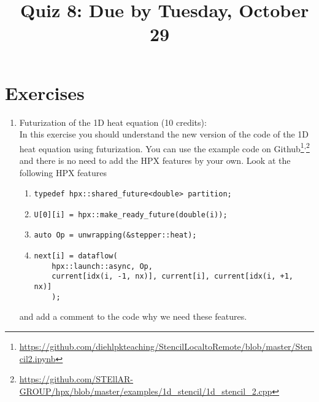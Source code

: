 \documentclass[11pt]{article}
\begin{document}
\title{\coursename~Quiz 8: Due by Tuesday, October 29}
\date{}
\maketitle

\medskip


\section*{Exercises}

\begin{enumerate}
\item Futurization of the 1D heat equation (10 credits): \\
In this exercise you should understand the new version of the code of the 1D heat equation using futurization. You can use the example code on Github\footnote{\url{https://github.com/diehlpkteaching/StencilLocaltoRemote/blob/master/Stencil2.ipynb}}\textsuperscript{,}\footnote{\url{https://github.com/STEllAR-GROUP/hpx/blob/master/examples/1d_stencil/1d_stencil_2.cpp}} and there is no need to add the HPX features by your own. Look at the following HPX features
\begin{enumerate}
\item \lstinline|typedef hpx::shared_future<double> partition;|
\item \lstinline|U[0][i] = hpx::make_ready_future(double(i));|
\item \lstinline|auto Op = unwrapping(&stepper::heat);|
\item \begin{lstlisting}
next[i] = dataflow(
	hpx::launch::async, Op,
	current[idx(i, -1, nx)], current[i], current[idx(i, +1, nx)]
	);
\end{lstlisting}
\end{enumerate}
and add a comment to the code why we need these features.


\end{enumerate}
\doclicenseThis 
\end{document}
